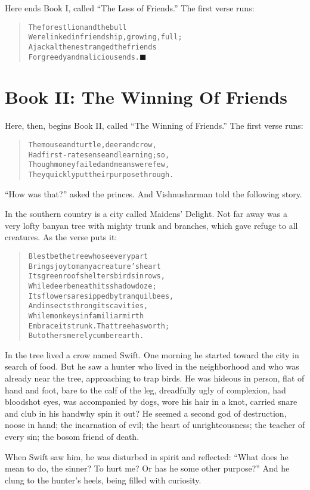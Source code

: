 \documentclass[article, twoside, 14pt]{memoir}
\newcommand{\qed}{\hfill \ensuremath{\blacksquare}}
\renewenvironment{verbatim}{%
\begin{quote}%
\vskip -10pt%
\begin{alltt}\normalfont\large}{\end{alltt}%
\end{quote}%
\vskip -10pt
} %
\begin{document}
Here ends Book I, called ``The Loss of Friends.'' The first verse
runs:

\begin{verbatim}
The forest lion and the bull
Were linked in friendship, growing, full;
A jackal then estranged the friends
For greedy and malicious ends.\hyperref[s1]{\qed}
\end{verbatim}
\part{Book II: The Winning Of Friends}

\label{s35}

Here, then, begins Book II, called
``The Winning of Friends.'' The first verse runs:

\begin{verbatim}
The mouse and turtle, deer and crow,
Had first-rate sense and learning; so,
Though money failed and means were few,
They quickly put their purpose through.
\end{verbatim}
``How was that?'' asked the princes. And Vishnusharman told the
following story.

In the southern country is a city called Maidens'
\label{s36}Delight. Not far away was a very lofty banyan tree with
mighty trunk and branches, which gave refuge to all creatures. As
the verse puts it:

\begin{verbatim}
Blest be the tree whose every part
Brings joy to many a creature's heart{\textemdash}
Its green roof shelters birds in rows,
While deer beneath its shadow doze;
Its flowers are sipped by tranquil bees,
And insects throng its cavities,
While monkeys in familiar mirth
Embrace its trunk. That tree has worth;
But others merely cumber earth.
\end{verbatim}
In the tree lived a crow named Swift. One morning he started toward
the city in search of food. But he saw a hunter who lived in the
neighborhood and who was already near the tree, approaching to trap
birds. He was hideous in person, flat of hand and foot, bare to the
calf of the leg, dreadfully ugly of complexion, had bloodshot eyes,
was accompanied by dogs, wore his hair in a knot, carried snare and
club in his hand{\textemdash}why spin it out? He seemed a second god of
destruction, noose in hand; the incarnation of evil; the heart of
unrighteousness; the teacher of every sin; the bosom friend of
death.

When Swift saw him, he was disturbed in spirit and reflected:
``What does he mean to do, the sinner? To hurt me? Or has he some other purpose?''
And he clung to the hunter's heels, being filled with curiosity.
\end{document}
